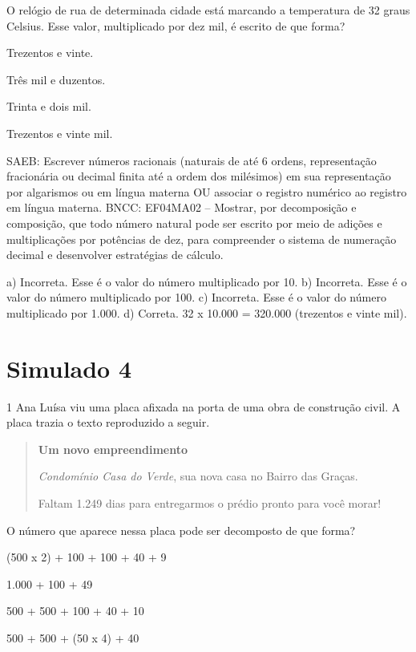 \begin{mdframed}[linewidth=2pt,linecolor=salmao,roundcorner=2pt]
\begin{escolha}
{\begin{escolha}
O relógio de rua de determinada cidade está marcando a temperatura
de 32 graus Celsius. Esse valor, multiplicado por dez mil, é escrito de que forma?

\begin{escolha}
\item Trezentos e vinte.
\item Três mil e duzentos.
\item Trinta e dois mil.
\item Trezentos e vinte mil.
\end{escolha}

SAEB: Escrever números racionais (naturais de até 6 ordens, representação
fracionária ou decimal finita até a ordem dos milésimos) em sua
representação por algarismos ou em língua materna OU associar o registro
numérico ao registro em língua materna.
BNCC: EF04MA02 -- Mostrar, por decomposição e composição, que todo número natural pode ser escrito
por meio de adições e multiplicações por potências de dez, para compreender o sistema de
numeração decimal e desenvolver estratégias de cálculo.

a) Incorreta. Esse é o valor do número multiplicado por 10.
b) Incorreta. Esse é o valor do número multiplicado por 100.
c) Incorreta. Esse é o valor do número multiplicado por 1.000.
d) Correta. 32 x 10.000 = 320.000 (trezentos e vinte mil).

\chapter{Simulado 4}

\num{1} Ana Luísa viu uma placa afixada na porta de uma obra de construção civil. A placa trazia o texto reproduzido a seguir.

\begin{quote}
\textbf{Um novo empreendimento}

\textit{Condomínio Casa do Verde}, sua nova casa no Bairro das Graças.

Faltam 1.249 dias para entregarmos o prédio pronto para você morar!
\end{quote}

O número que aparece nessa placa pode ser decomposto de que forma?

\begin{escolha}
\item (500 x 2) + 100 + 100 + 40 + 9
\item 1.000 + 100 + 49  
\item 500 + 500 + 100 + 40 + 10  
\item 500 + 500 + (50 x 4) + 40
  

\end{escolha}
\end{escolha}}
\end{escolha}
\end{mdframed}
